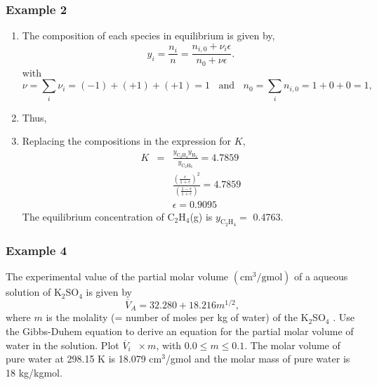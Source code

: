 \documentclass[10pt,compress]{beamer}
\newcommand{\frc}{\displaystyle\frac}
\begin{document}
\begin{frame}
 \frametitle{Example 2}
\begin{enumerate}\scriptsize \setcounter{enumi}{6}
      \item<1-> The composition of each species in equilibrium is given by,
         \begin{displaymath}
           y_{i} = \frc{n_{i}}{n} = \frc{n_{i,0}+\nu_{i}\epsilon}{n_{0}+\nu\epsilon}.
         \end{displaymath}
         with 
         \begin{displaymath}
            \nu = \sum\limits_{i}\nu_{i}= (-1)+(+1)+(+1)= 1 \;\;\text{ and }\;\; n_{0} = \sum\limits_{i}n_{i,0}= 1 + 0 + 0 = 1,
         \end{displaymath}
      \item<2-> Thus,
         \visible<2->{\begin{displaymath}
             y_{\text{C}_{2}\text{H}_{6}} = \frc{1-\epsilon}{1+\epsilon},\;\;y_{\text{C}_{2}\text{H}_{4}} = \frc{\epsilon}{1+\epsilon}\;\text{ and }\;y_{\text{H}_{2}} = \frc{\epsilon}{1+\epsilon}
         \end{displaymath}}
      \item<3-> Replacing the compositions in the expression for $K$,
         \begin{eqnarray}
            K  &=& \frc{y_{\text{C}_{2}\text{H}_{4}} y_{\text{H}_{2}}}{y_{\text{C}_{2}\text{H}_{6}}} = 4.7859 \nonumber \\
               &&  \frc{\left(\frc{\epsilon}{1+\epsilon}\right)^{2}}{\left(\frc{1-\epsilon}{1+\epsilon}\right)} =4.7859 \nonumber \\
            &&\epsilon = 0.9095 \nonumber
         \end{eqnarray}
        The equilibrium concentration of C$_{2}$H$_{4}$(g) is $y_{\text{C}_{2}\text{H}_{4}} =$ 0.4763.

\end{enumerate} 

\end{frame}

\begin{frame}
 \frametitle{Example 4}
The experimental value of the partial molar volume $\left(\text{cm}^{3}/\text{gmol}\right)$ of a aqueous solution of K$_{2}$SO$_{4}$ is given by
                \begin{displaymath}
                   \overline{V}_{A} = 32.280 + 18.216 m^{1/2},
                \end{displaymath} 
 where $m$ is the molality (= number of moles per kg of water) of the K$_{2}$SO$_{4}$ . Use the Gibbs-Duhem equation to derive an equation for the partial molar volume of water in the solution. Plot $\overline{V}_{i}\;\;\times m$, with $0.0\leq m\leq 0.1$. The molar volume of pure water at 298.15 K is 18.079 cm$^{3}$/gmol and the molar mass of pure water is 18 kg/kgmol.

\end{frame}
\end{document}
